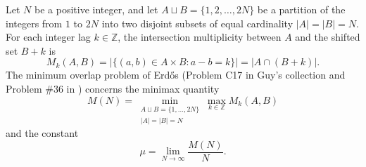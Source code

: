 \documentclass[11pt,a4paper]{article}
\theoremstyle{definition}
\theoremstyle{remark}
\newcommand{\Z}{\mathbb{Z}}
\begin{document}
Let $N$ be a positive integer, and let $A \sqcup B = \{1, 2, \dots, 2N\}$ be a partition of the integers from $1$ to $2N$ into two disjoint subsets of equal cardinality $|A| = |B| = N$. For each integer lag $k \in \Z$, the intersection multiplicity between $A$ and the shifted set $B + k$ is
\begin{equation}
M_k(A, B) = |\{ (a, b) \in A \times B : a - b = k \} | = |A \cap (B + k)|.
\end{equation}
The minimum overlap problem of Erd\H{o}s \cite{erdos1955} (Problem C17 in Guy's collection \cite{guy2004} and Problem \#36 in \cite{erdosproblems36}) concerns the minimax quantity
\begin{equation}
M(N) = \min_{\substack{A \sqcup B = \{1, \dots, 2N\} \\ |A| = |B| = N}} \max_{k \in \Z} M_k(A, B)
\end{equation}
and the constant
\begin{equation}
\mu = \lim_{N \to \infty} \frac{M(N)}{N}.
\end{equation}
\end{document}
